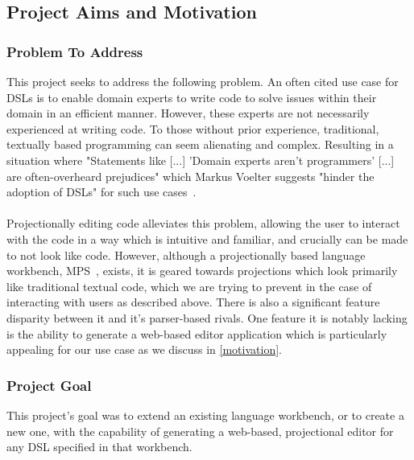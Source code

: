 \documentclass{article}
\begin{document}
\subsection{Project Aims and Motivation}

\subsubsection{Problem To Address}\label{problem}

This project seeks to address the following problem. An often cited use case for DSLs is to enable domain experts to write code to solve issues within their domain in an efficient manner. However, these experts are not necessarily experienced at writing code. To those without prior experience, traditional, textually based programming can seem alienating and complex. Resulting in a situation where "Statements like [...] 'Domain experts aren't programmers' [...] are often-overheard prejudices" which Markus Voelter suggests "hinder the adoption of DSLs" for such use cases~\cite{dslEngineering}.
\\
\\
Projectionally editing code alleviates this problem, allowing the user to interact with the code in a way which is intuitive and familiar, and crucially can be made to not look like code. However, although a projectionally based language workbench, MPS~\cite{mps}, exists, it is geared towards projections which look primarily like traditional textual code, which we are trying to prevent in the case of interacting with users as described above. There is also a significant feature disparity between it and it's parser-based rivals. One feature it is notably lacking is the ability to generate a web-based editor application which is particularly appealing for our use case as we discuss in \ref{motivation}.

\subsubsection{Project Goal}\label{goal}
This project's goal was to extend an existing language workbench, or to create a new one, with the capability of generating a web-based, projectional editor for any DSL specified in that workbench. 
\end{document}
